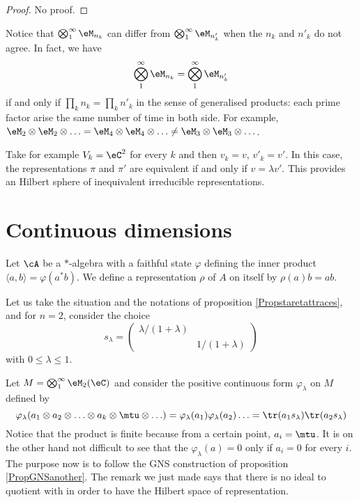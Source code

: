 \begin{proof}
No proof.
\end{proof}

Notice that $\bigotimes_{1}^{\infty}\eM_{n_k}$ can differ from $\bigotimes_{1}^{\infty}\eM_{n'_k}$ when the $n_k$ and $n'_k$ do not agree. In fact, we have
\[ 
\bigotimes_{1}^{\infty}\eM_{n_k} =\bigotimes_{1}^{\infty}\eM_{n'_k}
\]
if and only if $\prod_k n_k=\prod_k n'_k$ in the sense of generalised products: each prime factor arise the same number of time in both side. For example, $\eM_2\otimes\eM_2\otimes\ldots=\eM_4\otimes\eM_4\otimes\ldots\neq \eM_3\otimes\eM_3\otimes\ldots$.

Take for example $V_k=\eC^2$ for every $k$ and then $v_k=v$, $v'_k=v'$. In this case, the representations $\pi$ and $\pi'$ are equivalent if and only if $v=\lambda v'$. This provides an Hilbert sphere of inequivalent irreducible representations.

\section{Continuous dimensions}

Let $\cA$ be a $*$-algebra with a faithful state $\varphi$ defining the inner product $\langle a, b\rangle =\varphi(a^*b)$. We define a representation $\rho$ of $A$ on itself by $\rho(a)b=ab$.

Let us take the situation and the notations of proposition \ref{Propstaretattraces}, and for $n=2$, consider the choice 
\[ 
  s_{\lambda}=
\begin{pmatrix}
\lambda/(1+\lambda)\\
		&		1/(1+\lambda)
\end{pmatrix}
\]
with $0\leq\lambda\leq 1$.

Let $M=\bigotimes_1^{\infty}\eM_2(\eC)$ and consider the positive continuous form $\varphi_{\lambda}$ on $M$ defined by
\begin{equation}
\varphi_{\lambda}(a_1\otimes a_2\otimes\ldots\otimes a_k\otimes\mtu\otimes\ldots)=\varphi_{\lambda}(a_1)\varphi_{\lambda}(a_2)\ldots=\tr(a_1s_{\lambda})\tr(a_2s_{\lambda})
\end{equation}
Notice that the product is finite because from a certain point, $a_i=\mtu$. It is on the other hand not difficult to see that the $\varphi_{\lambda}(a)=0$ only if $a_i=0$ for every $i$. The purpose now is to follow the GNS construction of proposition \ref{PropGNSanother}. The remark we just made says that there is no ideal to quotient with in order to have the Hilbert space of representation.

